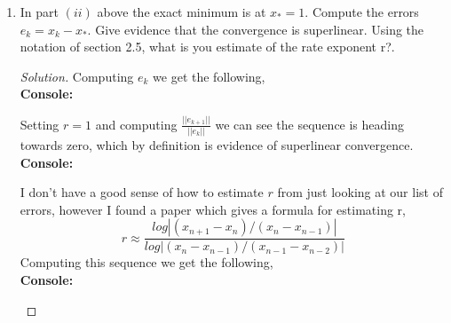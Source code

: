 \documentclass[12pt]{article}
\makeatletter
\theoremstyle{homework}
\newenvironment{exercise}[1]
{\def\@currentlabel{#1}\exercisecore}
{\endexercisecore}
\makeatother
\begin{document}
\begin{exercise}{P17}
\begin{enumerate}
\begin{enumerate}
    

      \item[(ii)] $f(x) = 3x^4 - 4x^3 + 3x^2 - 6x$ with $x_0 = -1$ and $x_1 = 0$.   
      \begin{proof}[Solution] 

        \textbf{Console:}
        \begin{center}
          
        \end{center}
      \end{proof}
    \end{enumerate} 
\vspace{.5in}

\item[(c)] In part $(ii)$ above the exact minimum is at $x_* = 1$. Compute the errors $e_k = x_k - x_*$. Give evidence that the convergence is 
superlinear. Using the notation of section 2.5, what is you estimate of the rate exponent r?.
\begin{proof}[Solution] Computing $e_k$ we get the following, \\

  \textbf{Console:}
        \begin{center}
          
        \end{center}

Setting $r = 1$ and computing $\frac{||e_{k + 1}||}{||e_k||}$ we can see the sequence is heading towards zero, which by definition is evidence of 
superlinear convergence.\\

\textbf{Console:}
\begin{center}
  
\end{center}


I don't have a good sense of how to estimate $r$ from just looking at our list of errors, however I found a paper\cite{1} which gives a formula 
for estimating r, 
\begin{equation*}
  r \approx \dfrac{log|(x_{n + 1} - x_n)/(x_{n} - x_{n - 1})|}{log|(x_{n} - x_{n - 1})/(x_{n - 1} - x_{n - 2})|}
\end{equation*}
Computing this sequence we get the following, \\

\textbf{Console:}
\begin{center}
  
\end{center}


\end{proof}
\end{enumerate}
\end{exercise}
\end{document}
